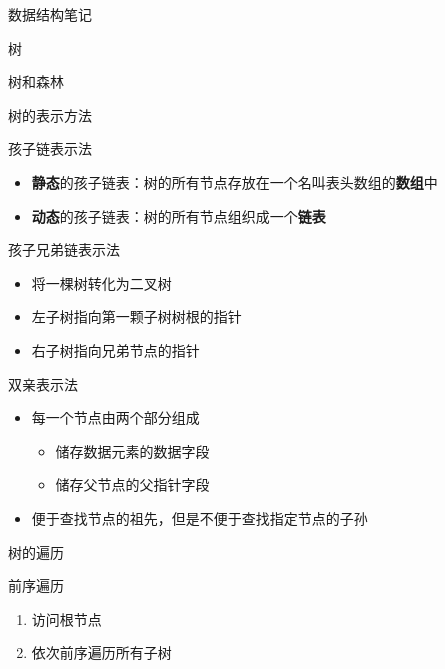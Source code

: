 \documentclass[
  ignorenonframetext,
]{beamer}
\providecommand{\tightlist}{%
  \setlength{\itemsep}{0pt}\setlength{\parskip}{0pt}}
\begin{document}
\begin{frame}[fragile]{数据结构笔记}
\begin{block}{树}
\begin{block}{树和森林}
\begin{block}{树的表示方法}
\begin{block}{孩子链表示法}
\begin{itemize}
  \begin{itemize}
  \tightlist
  \item
    储存数据元素值的数据部分
  \item
    指向孩子链的指针
  \end{itemize}
\item
  \textbf{静态}的孩子链表：树的所有节点存放在一个名叫表头数组的\textbf{数组}中
\item
  \textbf{动态}的孩子链表：树的所有节点组织成一个\textbf{链表}
\end{itemize}
\end{block}

\begin{block}{孩子兄弟链表示法}
\protect{}\label{ux5b69ux5b50ux5144ux5f1fux94feux8868ux793aux6cd5}
\begin{itemize}
\tightlist
\item
  将一棵树转化为二叉树
\item
  左子树指向第一颗子树树根的指针
\item
  右子树指向兄弟节点的指针
\end{itemize}

\end{block}

\begin{block}{双亲表示法}
\protect{}\label{ux53ccux4eb2ux8868ux793aux6cd5}
\begin{itemize}
\tightlist
\item
  每一个节点由两个部分组成

  \begin{itemize}
  \tightlist
  \item
    储存数据元素的数据字段
  \item
    储存父节点的父指针字段
  \end{itemize}
\item
  便于查找节点的祖先，但是不便于查找指定节点的子孙
\end{itemize}
\end{block}
\end{block}
\end{block}

\begin{block}{树的遍历}
\protect{}\label{ux6811ux7684ux904dux5386}
\begin{block}{前序遍历}
\protect{}\label{ux524dux5e8fux904dux5386-3}
\begin{enumerate}
\tightlist
\item
  访问根节点
\item
  依次前序遍历所有子树
\end{enumerate}
\end{block}


\end{block}
\end{block}
\end{frame}
\end{document}
